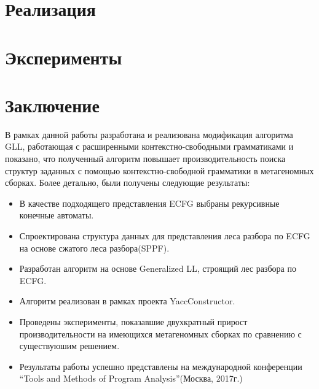 \documentclass[12pt]{matmex-diploma-custom}
\begin{document}
	
	
	
	
	
	\section{Реализация}
	\section{Эксперименты}
	
	\section*{Заключение}
	В рамках данной работы разработана и реализована модификация алгоритма GLL,
	работающая с расширенными контекстно-свободными грамматиками и показано, что полученный
	алгоритм повышает производительность поиска структур заданных с помощью контекстно-свободной
	грамматики в метагеномных сборках. Более детально, были получены следующие результаты:
	\begin{itemize}
		\item В качестве подходящего представления ECFG выбраны рекурсивные конечные автоматы.
		\item Спроектирована структура данных для представления леса разбора по ECFG 
		на основе сжатого леса разбора(SPPF).
		\item Разработан алгоритм на основе Generalized LL, строящий лес разбора по ECFG.
		\item Алгоритм реализован в рамках проекта YaccConstructor.
		\item Проведены эксперименты, показавшие двухкратный прирост 
		производительности на имеющихся метагеномных сборках по сравнению 
		с существуюшим решением.
		\item Результаты работы успешно представлены на международной конференции
		``Tools and Methods of Program Analysis''(Москва, 2017г.)
	\end{itemize}
	
	\setmonofont[Mapping=tex-text]{CMU Typewriter Text}
	
	
	
\end{document}
